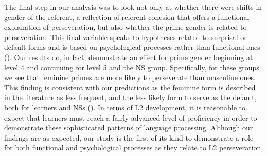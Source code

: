\documentclass[output=paper]{langscibook}
\begin{document}
The final step in our analysis was to look not only at whether there were shifts in gender of the referent, a reflection of referent cohesion that offers a functional explanation of perseveration, but also whether the prime gender is related to perseveration. This final variable speaks to hypotheses related to surprisal or default forms and is based on psychological processes rather than functional ones (\citealt{Jaeger2007}). Our results do, in fact, demonstrate an effect for prime gender beginning at level 4 and continuing for level 5 and the NS group. Specifically, for these groups we see that feminine primes are more likely to perseverate than masculine ones. This finding is consistent with our predictions as the feminine form is described in the literature as less frequent, and the less likely form to serve as the default, both for learners and NSs (\citealt{Alarcón2010, Klee1989, Malovrh2014}). In terms of L2 development, it is reasonable to expect that learners must reach a fairly advanced level of proficiency in order to demonstrate these sophisticated patterns of language processing. Although our findings are as expected, our study is the first of its kind to demonstrate a role for both functional and psychological processes as they relate to L2 perseveration.
\end{document}
